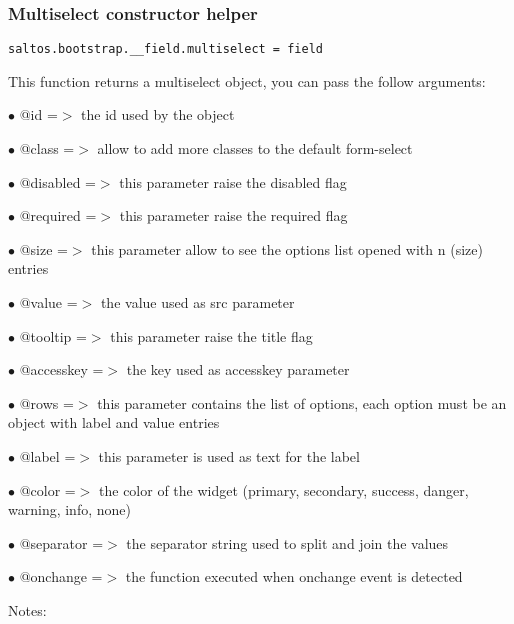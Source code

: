 \documentclass[a4paper]{article}
\begin{document}
\hypertarget{toc622}{}
\subsubsection{Multiselect constructor helper}

\begin{lstlisting}
saltos.bootstrap.__field.multiselect = field
\end{lstlisting}

This function returns a multiselect object, you can pass the follow arguments:

\begin{compactitem}
\item[\color{myblue}$\bullet$] @id        =$>$ the id used by the object
\item[\color{myblue}$\bullet$] @class     =$>$ allow to add more classes to the default form-select
\item[\color{myblue}$\bullet$] @disabled  =$>$ this parameter raise the disabled flag
\item[\color{myblue}$\bullet$] @required  =$>$ this parameter raise the required flag
\item[\color{myblue}$\bullet$] @size      =$>$ this parameter allow to see the options list opened with n (size) entries
\item[\color{myblue}$\bullet$] @value     =$>$ the value used as src parameter
\item[\color{myblue}$\bullet$] @tooltip   =$>$ this parameter raise the title flag
\item[\color{myblue}$\bullet$] @accesskey =$>$ the key used as accesskey parameter
\item[\color{myblue}$\bullet$] @rows      =$>$ this parameter contains the list of options, each option must be an object
              with label and value entries
\item[\color{myblue}$\bullet$] @label     =$>$ this parameter is used as text for the label
\item[\color{myblue}$\bullet$] @color     =$>$ the color of the widget (primary, secondary, success, danger, warning, info, none)
\item[\color{myblue}$\bullet$] @separator =$>$ the separator string used to split and join the values
\item[\color{myblue}$\bullet$] @onchange  =$>$ the function executed when onchange event is detected
\end{compactitem}

Notes:
\end{document}
